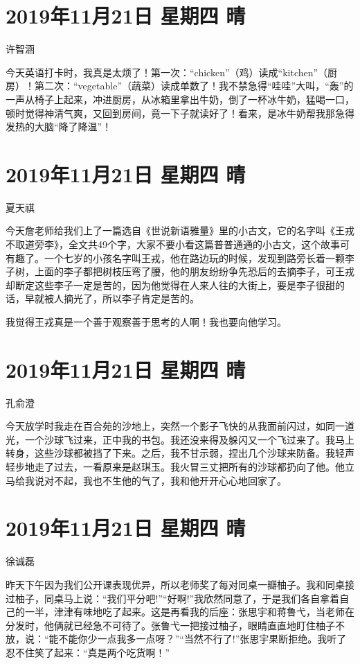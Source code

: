 \section{2019年11月21日 星期四 晴}

许智涵

今天英语打卡时，我真是太烦了！第一次：``chicken''（鸡）读成``kitchen''（厨房）！第二次：``vegetable''（蔬菜）读成单数了！我不禁急得``哇哇''大叫，``轰''的一声从椅子上起来，冲进厨房，从冰箱里拿出牛奶，倒了一杯冰牛奶，猛喝一口，顿时觉得神清气爽，又回到房间，竟一下子就读好了！看来，是冰牛奶帮我那急得发热的大脑``降了降温''！

\section{2019年11月21日 星期四 晴}

夏天祺

今天詹老师给我们上了一篇选自《世说新语雅量》里的小古文，它的名字叫《王戎不取道旁李》，全文共49个字，大家不要小看这篇普普通通的小古文，这个故事可有趣了。一个七岁的小孩名字叫王戎，他在路边玩的时候，发现到路旁长着一颗李子树，上面的李子都把树枝压弯了腰，他的朋友纷纷争先恐后的去摘李子，可王戎却断定这些李子一定是苦的，因为他觉得在人来人往的大街上，要是李子很甜的话，早就被人摘光了，所以李子肯定是苦的。

我觉得王戎真是一个善于观察善于思考的人啊！我也要向他学习。

\section{2019年11月21日 星期四 晴}

孔俞澄

今天放学时我走在百合苑的沙地上，突然一个影子飞快的从我面前闪过，如同一道光，一个沙球飞过来，正中我的书包。我还没来得及躲闪又一个飞过来了。我马上转身，这些沙球都被挡了下来。之后，我不甘示弱，捏出几个沙球来防备。我轻声轻步地走了过去，一看原来是赵琪玉。我火冒三丈把所有的沙球都扔向了他。他立马给我说对不起，我也不生他的气了，我和他开开心心地回家了。

\section{2019年11月21日 星期四 晴}

徐诚磊

昨天下午因为我们公开课表现优异，所以老师奖了每对同桌一瓣柚子。我和同桌接过柚子，同桌马上说：``我们平分吧!''``好啊!''我欣然同意了，于是我们各自拿着自己的一半，津津有味地吃了起来。这是再看我的后座：张思宇和蒋鲁弋，当老师在分发时，他俩就已经急不可待了。张鲁弋一把接过柚子，眼睛直直地盯住柚子不放，说：``能不能你少一点我多一点呀？''``当然不行了!''张思宇果断拒绝。我听了忍不住笑了起来：``真是两个吃货啊！''

